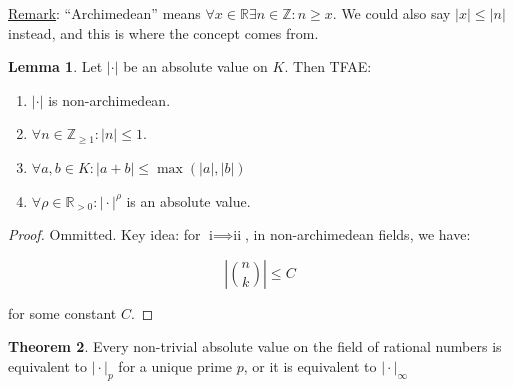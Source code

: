 \documentclass[openany]{amsbook}
\numberwithin{section}{chapter}
\theoremstyle{definition}
\newtheorem{theorem}{Theorem}[chapter]
\newtheorem{lemma}[theorem]{Lemma}
\begin{document}
\underline{Remark}: ``Archimedean'' means \(\forall x\in\mathbb{R} \exists n\in\mathbb{Z} :n \geq x\). We could also say \(\vert x \vert \leq \vert n \vert\) instead, and this is where the concept comes from.

\begin{lemma}
    Let \(\vert \cdot \vert \) be an absolute value on \(K\). Then TFAE:

    \begin{enumerate}[label=\roman*)]
        \item \(\vert \cdot \vert \) is non-archimedean. 
        \item \(\forall n\in \mathbb{Z} _{\geq 1}: \vert n \vert \leq 1\).
        \item \(\forall a,b\in K: \vert a+b \vert \leq \max (\vert a \vert , \vert b \vert )\) 
        \item \(\forall \rho \in \mathbb{R}_{> 0}: \vert \cdot \vert ^ \rho\) is an absolute value.
    \end{enumerate} 
\end{lemma}

\begin{proof}
    Ommitted. Key idea: for \(\text{i} \implies \text{ii}\), in non-archimedean fields, we have:

    \[
        \left\vert \binom{n}{k} \right\vert \leq C
    \]

    for some constant \(C\).
\end{proof}

\begin{theorem}
    Every non-trivial absolute value on the field of rational numbers is equivalent to \(\vert \cdot \vert _p\) for a unique prime \(p\), or it is equivalent to \(\vert \cdot \vert _ \infty \) 
\end{theorem}
\end{document}
